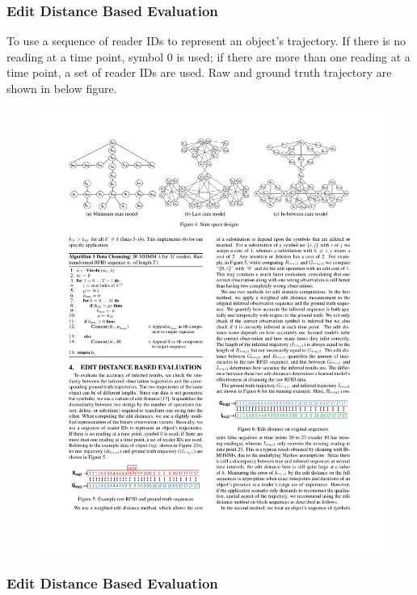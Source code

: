 \begin{frame}
\frametitle{Edit Distance Based Evaluation}

To use a sequence of reader IDs to represent an object's trajectory. If there is no reading at a time point, symbol 0 is used; if there are more than one reading at a time point, a set of reader IDs are used. Raw and ground truth trajectory are shown in below figure.

\begin{figure}[tb]
  \includegraphics[width=\columnwidth]{figures/3-5/3-5-10.pdf}
\end{figure}

\end{frame}


\begin{frame}
\frametitle{Edit Distance Based Evaluation}



\end{frame}
